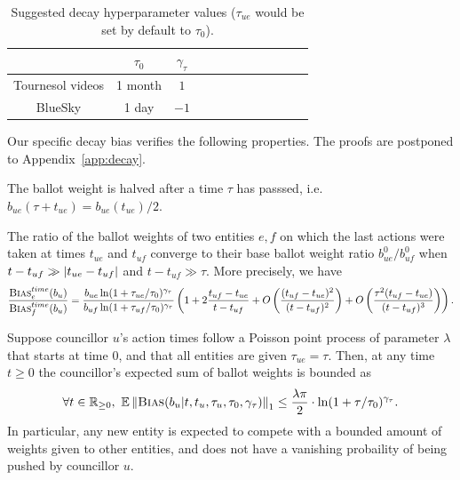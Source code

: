 \begin{table}[h!]
\begin{center}
\begin{tabular}{ |c|c|c|c|c|c|c|c|c|c|c|c| } 
 \hline
                    & $\tau_0$ & $\gamma_\tau$ \\ \hline
 Tournesol videos   & 1 month  & $1$       \\ \hline
 BlueSky            & 1 day    & $-1$      \\ 
 \hline
\end{tabular}
\caption{
    Suggested decay hyperparameter values
    ($\tau_{ue}$ would be set by default to $\tau_0$).
} 
\label{table:algorithmic_representative_hyperparameters}
\end{center}
\end{table}

Our specific decay bias verifies the following properties.
The proofs are postponed to Appendix~\ref{app:decay}.

\begin{proposition}
    \label{prop:decay_half}
    The ballot weight is halved after a time $\tau$ has passsed,
    i.e. $b_{ue} (\tau + t_{ue}) = b_{ue} (t_{ue}) / 2$.
\end{proposition}

\begin{proposition}
    \label{prop:asymptotic_weight_ratio}
    The ratio of the ballot weights of two entities $e, f$ 
    on which the last actions were taken at times $t_{ue}$ and $t_{uf}$
    converge to their base ballot weight ratio $b^0_{ue} / b^0_{uf}$
    when $t - t_{uf} \gg \left\lvert{t_{ue} - t_{uf}}\right\rvert$
    and $t - t_{uf} \gg \tau$.
    More precisely, we have
    \begin{align}
        \frac{\textsc{Bias}^{time}_e (b_u)}{\textsc{Bias}^{time}_f (b_u)}
        = \frac{
            b_{ue} \ln (1+\tau_{ue} / \tau_0)^{\gamma_\tau}
        }{
            b_{uf} \ln (1+\tau_{uf} / \tau_0)^{\gamma_\tau}
        } 
        \left( 1 + 
            2 \frac{t_{uf} - t_{ue}}{t - t_{uf}}  
            + O \left(\frac{(t_{uf} - t_{ue})^2}{(t - t_{uf})^2} \right)
            + O \left(\frac{\tau^2 (t_{uf} - t_{ue})}{(t - t_{uf})^3} \right)
        \right).
    \end{align}
\end{proposition}

\begin{proposition}
    \label{prop:sum_past_weights}
    Suppose councillor $u$'s action times follow a Poisson point process 
    of parameter $\lambda$ that starts at time $0$,
    and that all entities are given $\tau_{ue} = \tau$.
    Then, at any time $t \geq 0$ 
    the councillor's expected sum of ballot weights is bounded as
    \begin{align}
        \forall t \in \mathbb R_{\geq 0} ,~ 
        \mathbb E \left\lVert{\textsc{Bias}(b_u | t, t_u, \tau_u, \tau_0, \gamma_\tau)}\right\rVert_{1} 
        \leq \frac{\lambda \pi}{2} \cdot \ln (1+\tau / \tau_0)^{\gamma_\tau}.
    \end{align}
    In particular, any new entity is expected to compete
    with a bounded amount of weights given to other entities,
    and does not have a vanishing probaility of being pushed by councillor $u$.
\end{proposition}

